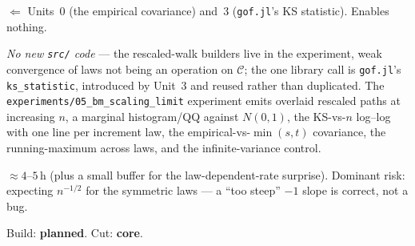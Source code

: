 \documentclass[11pt]{article}
\newenvironment{brief}{%
  \begin{description}[style=sameline,leftmargin=2.3cm,font=\bfseries\color{hubblue}]
}{%
  \end{description}
}
\begin{document}
\begin{brief}
\item[Depends on / enables] $\Leftarrow$ Units~0 (the empirical covariance) and~3 (\texttt{gof.jl}'s
KS statistic). Enables nothing.
\item[Deliverable shape] \emph{No new \texttt{src/} code} --- the rescaled-walk builders live in the
experiment, weak convergence of laws not being an operation on $\mathcal{C}$; the one library call is
\texttt{gof.jl}'s \texttt{ks\_statistic}, introduced by Unit~3 and reused rather than duplicated. The
\texttt{experiments/05\_bm\_scaling\_limit} experiment emits overlaid rescaled paths at increasing
$n$, a marginal histogram/QQ against $N(0,1)$, the KS-vs-$n$ log--log with one line per increment law,
the empirical-vs-$\min(s,t)$ covariance, the running-maximum across laws, and the infinite-variance
control.
\item[Effort \& risk] $\approx 4$--$5$\,h (plus a small buffer for the law-dependent-rate surprise).
Dominant risk: expecting $n^{-1/2}$ for the symmetric laws --- a ``too steep'' $-1$ slope is correct,
not a bug.
\item[Status] Build: \textbf{planned}. Cut: \textbf{core}.
\end{brief}

\end{document}
